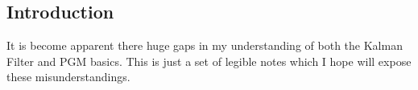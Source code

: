 \begin{center}
\section*{Introduction}
\end{center}
It is become apparent there huge gaps in my understanding of both the Kalman Filter and PGM basics. This is just a set of legible notes which I hope will expose these misunderstandings.